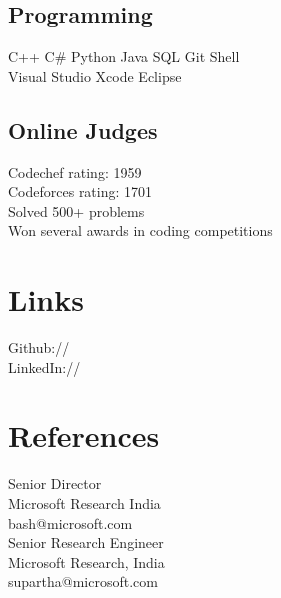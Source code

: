 \documentclass[]{resume-openfont}
\begin{document}
\begin{minipage}[t]{0.25\textwidth}
\subsection{Programming}
C++ \textbullet{}   C\# \textbullet{} Python \textbullet{} Java \textbullet{} SQL \textbullet{} Git \textbullet{} Shell\\
Visual Studio \textbullet{} Xcode\textbullet{} Eclipse \\

\sectionsep

\subsection{Online Judges}
Codechef rating: 1959 \\
Codeforces rating: 1701 \\
\textbullet{} Solved 500+ problems \\
\textbullet{} Won several awards in coding competitions
\sectionsep


\section{Links} 
Github:// \href{https://github.com/pranavr93}{} \\
LinkedIn://  \href{https://www.linkedin.com/in/pranavramarao}{} \\
\sectionsep


\section{References}
Senior Director \\
Microsoft Research India \\
bash@microsoft.com \\

\sectionsep
{}
Senior Research Engineer \\
Microsoft Research, India \\
supartha@microsoft.com

%
%

\end{minipage} 
\end{document}
